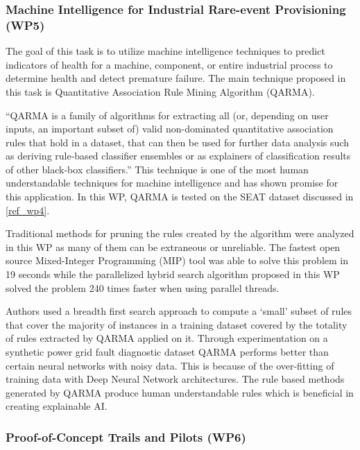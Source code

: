 \subsubsection{Machine Intelligence for Industrial Rare-event Provisioning (WP5)}

The goal of this task is to utilize machine intelligence techniques to predict indicators of health for a machine, component, or entire industrial process to determine health and detect premature failure. The main technique proposed in this task is Quantitative Association Rule Mining Algorithm (QARMA).

\enquote{QARMA is a family of algorithms for extracting all (or, depending on user inputs, an important subset of) valid non-dominated quantitative association rules that hold in a dataset, that can then be used for further data analysis such as deriving rule-based classifier ensembles or as explainers of classification results of other black-box classifiers.}  This technique is one of the most human understandable techniques for machine intelligence and has shown promise for this application. In this WP, QARMA is tested on the SEAT dataset discussed in \ref{ref_wp4}.

Traditional methods for pruning the rules created by the algorithm were analyzed in this WP as many of them can be extraneous or unreliable. The fastest open source Mixed-Integer Programming (MIP) tool was able to solve this problem in 19 seconds while the parallelized hybrid search algorithm proposed in this WP solved the problem 240 times faster when using parallel threads.

Authors \cite{wp5.1} used a breadth first search approach to compute a `small' subset of rules that cover the majority of instances in a training dataset covered by the totality of rules extracted by QARMA applied on it. Through experimentation on a synthetic power grid fault diagnostic dataset QARMA performs better than certain neural networks with noisy data. This is because of the over-fitting of training data with Deep Neural Network architectures. The rule based methods generated by QARMA produce human understandable rules which is beneficial in creating explainable AI.

\subsubsection{Proof-of-Concept Trails and Pilots (WP6)}
\label{ref_wp6}


